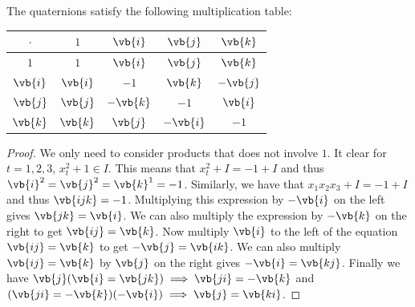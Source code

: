 \documentclass[a4paper]{article}
\begin{document}
\begin{prp}{}{} The quaternions satisfy the following multiplication table: \begin{center}
\begin{tabular}{ |c|c|c|c|c| } 
\hline
$\cdot$ & $1$ & $\vb{i}$ & $\vb{j}$ & $\vb{k}$\\\hline
$1$ & $1$ & $\vb{i}$ & $\vb{j}$ & $\vb{k}$\\\hline
$\vb{i}$ & $\vb{i}$ & $-1$& $\vb{k}$ & $-\vb{j}$ \\\hline
$\vb{j}$ & $\vb{j}$& $-\vb{k}$& $-1$& $\vb{i}$\\\hline
$\vb{k}$ & $\vb{k}$ & $\vb{j}$ & $-\vb{i}$ & $-1$\\\hline
\end{tabular}
\end{center}
\begin{proof}
We only need to consider products that does not involve $1$. It clear for $t=1,2,3$, $x_t^2+1\in I$. This means that $x_t^2+I=-1+I$ and thus $\vb{i}^2=\vb{j}^2=\vb{k}^1=-1$. Similarly, we have that $x_1x_2x_3+I=-1+I$ and thus $\vb{ijk}=-1$. Multiplying this expression by $-\vb{i}$ on the left gives $\vb{jk}=\vb{i}$. We can also multiply the expression by $-\vb{k}$ on the right to get $\vb{ij}=\vb{k}$. Now multiply $\vb{i}$ to the left of the equation $\vb{ij}=\vb{k}$ to get $-\vb{j}=\vb{ik}$. We can also multiply $\vb{ij}=\vb{k}$ by $\vb{j}$ on the right gives $-\vb{i}=\vb{kj}$. Finally we have $\vb{j}(\vb{i}=\vb{jk})\implies\vb{ji}=-\vb{k}$ and $(\vb{ji}=-\vb{k})(-\vb{i})\implies\vb{j}=\vb{ki}$. 
\end{proof}
\end{prp}
\end{document}
